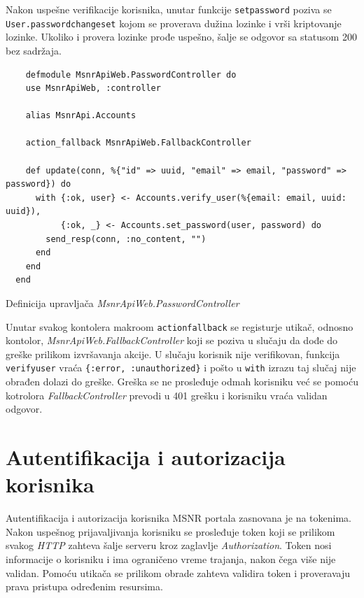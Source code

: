 \documentclass[12pt,oneside]{memoir}
\begin{document}
Nakon uspešne verifikacije korisnika, unutar funkcije \texttt{set{\textunderscore}password} poziva se
\texttt{User.password{\textunderscore}changeset} kojom se proverava dužina lozinke i vrši kriptovanje lozinke.
Ukoliko i provera lozinke prođe uspešno, šalje se odgovor sa statusom 200 bez sadržaja.

\begin{listing}[h!]
  \begin{verbatim}
    defmodule MsnrApiWeb.PasswordController do
    use MsnrApiWeb, :controller
  
    alias MsnrApi.Accounts
  
    action_fallback MsnrApiWeb.FallbackController
  
    def update(conn, %{"id" => uuid, "email" => email, "password" => password}) do
      with {:ok, user} <- Accounts.verify_user(%{email: email, uuid: uuid}),
           {:ok, _} <- Accounts.set_password(user, password) do
        send_resp(conn, :no_content, "")
      end
    end
  end
\end{verbatim}
\caption{Definicija upravljača \emph{MsnrApiWeb.PasswordController}}
\label{listing:password-controller}
\end{listing}

Unutar svakog kontolera makroom \texttt{action{\textunderscore}fallback} se registurje utikač, odnosno kontolor,
\emph{MsnrApiWeb.FallbackController} koji se poziva u slučaju da dođe do greške prilikom izvršavanja akcije.
U slučaju korisnik nije verifikovan, funkcija \texttt{verify{\textunderscore}user} vraća \texttt{\{:error, :unauthorized\}}
i pošto u \texttt{with} izrazu taj slučaj nije obrađen dolazi do greške. Greška se ne prosleđuje odmah korisniku već
se pomoću kotrolora \emph{FallbackController} prevodi u 401 grešku i korisniku vraća validan odgovor. 

\section{Autentifikacija i autorizacija korisnika}
Autentifikacija i autorizacija korisnika MSNR portala zasnovana je na tokenima. Nakon uspešnog prijavaljivanja korisniku
se prosleđuje token koji se prilikom svakog \emph{HTTP} zahteva šalje serveru kroz zaglavlje \emph{Authorization}.
Token nosi informacije o korisniku i ima ograničeno vreme trajanja, nakon čega više nije validan.
Pomoću utikača se prilikom obrade zahteva validira token i proveravaju prava pristupa određenim resursima.
\end{document}
